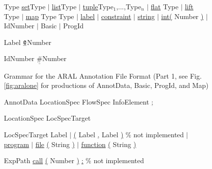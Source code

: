 \documentclass[a4paper,12pt]{report}
\begin{document}
{\begin{figure}[!ht]
\begin{GRAMMAR}
{Type}           \>\>\>\>\>\garrow\> \underline{set}\lb Type \rb
                 \>\>\>\>\> \> $\mid$ \underline{list}\lb Type \rb
                 \>\>\>\>\> \> $\mid$ \underline{tuple}\lb Type$_1$,...,Type$_n$ \rb
                 \>\>\>\>\> \> $\mid$ \underline{flat} \lb Type \rb
                 \>\>\>\>\> \> $\mid$ \underline{lift} \lb Type \rb
                 \>\>\>\>\> \> $\mid$ \underline{map} \lb Type \comma Type \rb
                 \>\>\>\>\> \> $\mid$ \underline{label}
                 \>\>\>\>\> \> $\mid$ \underline{constraint}
                \>\>\>\>\> \> $\mid$ \underline{string}
                \>\>\>\>\> \> $\mid$ \underline{int(} Number \underline{)}
                 \>\>\>\>\> \> $\mid$ IdNumber
                 \>\>\>\>\> \> $\mid$ Basic
                 \>\>\>\>\> \> $\mid$ ProgId

{Label}           \>\>\>\>\>\garrow\> $\texttt{\underline{@}}$Number

{IdNumber}       \>\>\>\>\>\garrow\> $\underline{\texttt{\#}}$Number

\end{GRAMMAR}
\caption{Grammar for the ARAL Annotation File Format (Part 1, see Fig. \ref{fig:aralone} for productions of AnnotData, Basic, ProgId, and Map)}
\label{fig:annotationfileformat}
\end{figure}

\begin{figure}[!ht]
\begin{GRAMMAR}
{AnnotData}      \>\>\>\>\>\garrow\> LocationSpec FlowSpec InfoElement \underline{;}

{LocationSpec}   \>\>\>\>\>\garrow\> [ ExpPath ] LocSpecTarget

{LocSpecTarget}  \>\>\>\>\>\garrow\>Label
                 \>\>\>\>\> \>$\mid$ \underline{(} Label \underline{,} Label \underline{)} \hspace{2cm}\% not implemented 
                 \>\>\>\>\> \>$\mid$ \underline{program}
                 \>\>\>\>\> \>$\mid$ \underline{file} \underline{(}  String \underline{)} 
                 \>\>\>\>\> \>$\mid$ \underline{function} \underline{(}  String \underline{)} 

{ExpPath}        \>\>\>\>\>\garrow\> \underline{call} \underline{(} Number \underline{)} \underline{:}  \% not implemented


\end{GRAMMAR}
\end{figure}}
\end{document}
